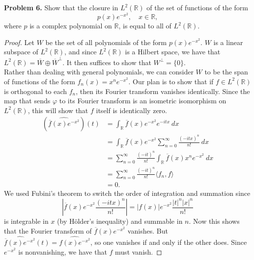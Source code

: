 \documentclass[11pt,letterpaper]{report}
\newcommand{\reals}{\mathbb{R}}
\begin{document}
\noindent\textbf{Problem 6. }
Show that the closure in $L^2(\reals)$ of the set of functions of the form
\[
p(x)e^{-x^2},\quad x\in \reals,
\]
where $p$ is a complex polynomial on $\reals$, is equal to all of $L^2(\reals)$.
\begin{proof}
	Let $W$ be the set of all polynomials of the form $p(x)e^{-x^2}$. $W$ is a linear subspace of $L^2(\reals)$, and since $L^2(\reals)$ is a Hilbert space, we have that $L^2(\reals) = \overline{W}\oplus \overline{W}^\perp$. It then suffices to show that $W^\perp= \{0\}$.\\

	\noindent Rather than dealing with general polynomials, we can consider $W$ to be the span of functions of the form $f_n(x) = x^ne^{-x^2}$. Our plan is to show that if $f\in L^2(\reals)$ is orthogonal to each $f_n$, then its Fourier transform vanishes identically. Since the map that sends $\varphi$ to its Fourier transform is an isometric isomorphism on $L^2(\reals)$, this will show that $f$ itself is identically zero.
	\begin{align*}
		(\widehat{\overline{f}(x)e^{-x^2}})(t)&= \int_\reals \overline{f}(x)e^{-x^2}e^{-itx}\ dx\\
		&= \int_\reals \overline{f}(x)e^{-x^2}\sum_{n=0}^\infty \frac{(-itx)^n}{n!}\ dx\\
		&= \sum_{n=0}^\infty \frac{(-it)^n}{n!}\int_\reals\overline{f}(x)x^ne^{-x^2}\ dx\\
		&= \sum_{n=0}^\infty \frac{(-it)^n}{n!}\langle f_n, f\rangle\\
		&= 0.
	\end{align*}
	We used Fubini's theorem to switch the order of integration and summation since
	\[
	\left|\overline{f}(x)e^{-x^2}\frac{(-itx)^n}{n!}\right| = |f(x)|e^{-x^2}\frac{|t|^n|x|^n}{n!}
	\]
	is integrable in $x$ (by H\"older's inequality) and summable in $n$. Now this shows that the Fourier transform of $\overline{f}(x)e^{-x^2}$ vanishes. But $\widehat{\overline{f}(x)e^{-x^2}}(t) = \widehat{f(x)e^{-x^2}}$, so one vanishes if and only if the other does. Since $e^{-x^2}$ is nonvanishing, we have that $f$ must vanish.
\end{proof}
\end{document}
